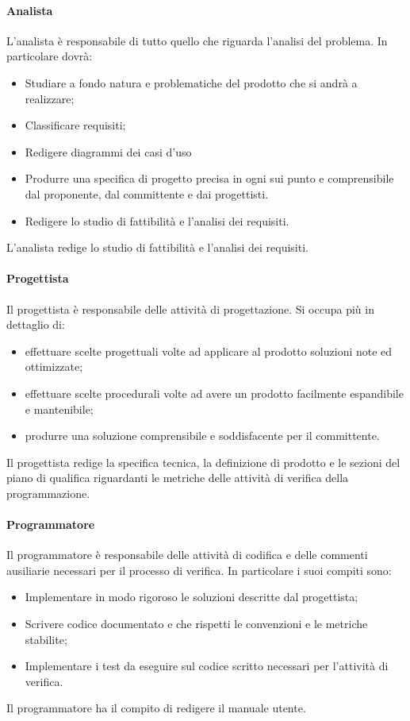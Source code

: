 \paragraph{Analista}
L'analista è responsabile di tutto quello che riguarda l'analisi del problema.
In particolare dovrà:
\begin{itemize}
	\item Studiare a fondo natura e problematiche del prodotto che si andrà a realizzare;
	\item Classificare requisiti;
	\item Redigere diagrammi dei casi d'uso
	\item Produrre una specifica di progetto precisa in ogni sui punto e comprensibile dal proponente, dal committente e dai progettisti.
	\item Redigere lo studio di fattibilità e l'analisi dei requisiti.
\end{itemize}
L'analista redige lo studio di fattibilità e l'analisi dei requisiti.
\paragraph{Progettista}
Il progettista è responsabile delle attività di progettazione. Si occupa più in dettaglio di:
\begin{itemize}
	\item effettuare scelte progettuali volte ad applicare al prodotto soluzioni note ed ottimizzate;
	\item effettuare scelte procedurali volte ad avere un prodotto facilmente espandibile e mantenibile;
	\item produrre una soluzione comprensibile e soddisfacente per il committente.
\end{itemize}
Il progettista redige la specifica tecnica, la definizione di prodotto e le sezioni del piano di qualifica riguardanti le metriche delle attività di verifica della programmazione.
\paragraph{Programmatore}
Il programmatore è responsabile delle attività di codifica e delle commenti ausiliarie necessari per il processo di verifica.
In particolare i suoi compiti sono:
\begin{itemize}
	\item Implementare in modo rigoroso le soluzioni descritte dal progettista;
	\item Scrivere codice documentato e che rispetti le convenzioni e le metriche stabilite;
	\item Implementare i test da eseguire sul codice scritto necessari per l'attività di verifica.
\end{itemize}
Il programmatore  ha il compito di redigere il manuale utente. 
